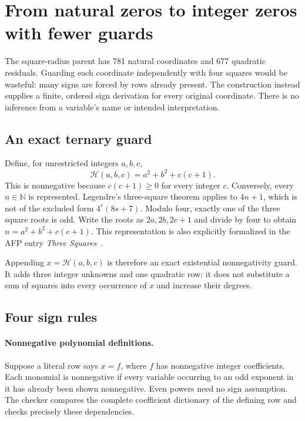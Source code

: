 \documentclass[11pt,letterpaper]{article}
\theoremstyle{definition}
\theoremstyle{remark}
\newcommand{\N}{\mathbb N}
\begin{document}
\section{From natural zeros to integer zeros with fewer guards}
\label{sec:integer}

The square-radius parent has 781 natural coordinates and 677 quadratic
residuals. Guarding each coordinate independently with four squares
would be wasteful: many signs are forced by rows already present.
The construction instead supplies a finite, ordered sign derivation for
every original coordinate. There is no inference from a variable's name
or intended interpretation.

\subsection{An exact ternary guard}

Define, for unrestricted integers $a,b,c$,
\[
                     \mathcal H(a,b,c)=a^2+b^2+c(c+1).
\]
This is nonnegative because $c(c+1)\ge0$ for every integer $c$.
Conversely, every $n\in\N$ is represented. Legendre's three-square
theorem applies to $4n+1$, which is not of the excluded form
$4^r(8s+7)$. Modulo four, exactly one of the three square roots is odd.
Write the roots as $2a,2b,2c+1$ and divide by four to obtain
$n=a^2+b^2+c(c+1)$. This representation is also explicitly formalized
in the AFP entry \emph{Three Squares}~\cite{three-squares}.

Appending $x=\mathcal H(a,b,c)$ is therefore an exact existential
nonnegativity guard. It adds three integer unknowns and one quadratic
row; it does not substitute a sum of squares into every occurrence of
$x$ and increase their degrees.

\subsection{Four sign rules}

\paragraph{Nonnegative polynomial definitions.}
Suppose a literal row says $x=f$, where $f$ has nonnegative integer
coefficients. Each monomial is nonnegative if every variable occurring
to an odd exponent in it has already been shown nonnegative. Even
powers need no sign assumption. The checker compares the complete
coefficient dictionary of the defining row and checks precisely these
dependencies.
\end{document}
